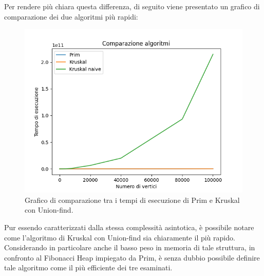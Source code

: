 Per rendere più chiara questa differenza, di seguito viene presentato un grafico di comparazione dei due algoritmi più rapidi:
\begin{figure}[H]
	\centering
	\includegraphics[width=1\linewidth]{"../graphs/algo"}
	\caption{Grafico di comparazione tra i tempi di esecuzione di Prim e Kruskal con Union-find.}
	\label{fig:2-comparison-graph}
\end{figure}
Pur essendo caratterizzati dalla stessa complessità asintotica, è possibile notare come l'algoritmo di Kruskal con Union-find sia chiaramente il più rapido. Considerando in particolare anche il basso peso in memoria di tale struttura, in confronto al Fibonacci Heap impiegato da Prim, è senza dubbio possibile definire tale algoritmo come il più efficiente dei tre esaminati.